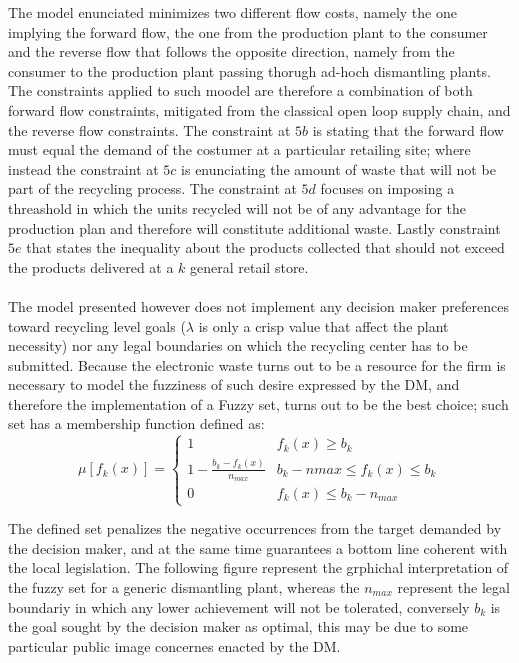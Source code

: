 \documentclass{article}
\begin{document}
The model enunciated minimizes two different flow costs, namely the one implying the forward flow, the one from the production plant to the consumer and the reverse flow that follows the opposite direction, namely from the consumer to the production plant passing thorugh ad-hoch dismantling plants. The constraints applied to such moodel are therefore a combination of both forward flow constraints, mitigated from the classical open loop supply chain, and the reverse flow constraints. The constraint at $5b$ is stating that the forward flow must equal the demand of the costumer at a particular retailing site; where instead the constraint at $5c$ is enunciating the amount of waste that will not be part of the recycling process. The constraint at $5d$ focuses on imposing a threashold in which the units recycled will not be of any advantage for the production plan and therefore will constitute additional waste. Lastly constraint $5e$ that states the inequality about the products collected that should not exceed the products delivered at a $k$ general retail store. 
\\
\\
The model presented however does not implement any decision maker preferences toward recycling level goals ($\lambda$ is only a crisp value that affect the plant necessity) nor any legal boundaries on which the recycling center has to be submitted. Because the electronic waste turns out to be a resource for the firm is necessary to model the fuzziness of such desire expressed by the DM, and therefore the implementation of a Fuzzy set\cite{Zadeh_1965}, turns out to be the best choice; such set has a membership function defined as:
$$
\mu [f_k(x)]=
\begin{cases}
1 & f_k(x) \geq b_k \\
1-\frac{b_k-f_k(x)}{n_{max}} & b_k -n{max} \leq f_k(x) \leq b_k \\
0 & f_k(x) \leq b_k - n_{max}
\end{cases}
$$

The defined set penalizes the negative occurrences from the target demanded by the decision maker, and at the same time guarantees a bottom line coherent with the local legislation. The following figure represent the grphichal interpretation of the fuzzy set for a generic dismantling plant, whereas the $n_{max}$ represent the legal boundariy in which any lower achievement will not be tolerated, conversely $b_k$ is the goal sought by the decision maker as optimal, this may be due to some particular public image concernes enacted by the DM. 
\end{document}
